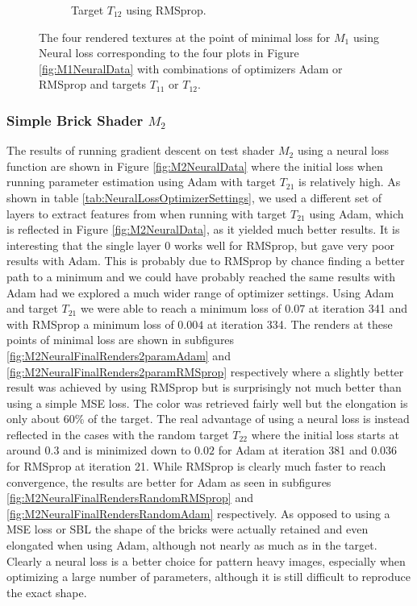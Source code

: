 \begin{figure}[hpb]
\begin{subfigure}[t]{.25\textwidth}
    \caption{Target $T_{12}$ using RMSprop.}
    \label{fig:M1NeuralFinalRendersRandomRMSprop}
\end{subfigure}
\caption{The four rendered textures at the point of minimal loss for $M_1$ using Neural loss corresponding to the four plots in Figure \ref{fig:M1NeuralData} with combinations of optimizers Adam or RMSprop and targets $T_{11}$ or $T_{12}$.}
\label{fig:M1NeuralFinalRenders}
\end{figure}

\subsubsection{Simple Brick Shader $M_2$}

The results of running gradient descent on test shader $M_2$ using a neural loss function are shown in Figure \ref{fig:M2NeuralData} where the initial loss when running parameter estimation using Adam with target $T_{21}$ is relatively high. As shown in table \ref{tab:NeuralLossOptimizerSettings}, we used a different set of layers to extract features from when running with target $T_{21}$ using Adam, which is reflected in Figure \ref{fig:M2NeuralData}, as it yielded much better results. It is interesting that the single layer 0 works well for RMSprop, but gave very poor results with Adam. This is probably due to RMSprop by chance finding a better path to a minimum and we could have probably reached the same results with Adam had we explored a much wider range of optimizer settings. Using Adam and target $T_{21}$ we were able to reach a minimum loss of $0.07$ at iteration 341 and with RMSprop a minimum loss of $0.004$ at iteration 334. The renders at these points of minimal loss are shown in subfigures \ref{fig:M2NeuralFinalRenders2paramAdam} and \ref{fig:M2NeuralFinalRenders2paramRMSprop} respectively where a slightly better result was achieved by using RMSprop but is surprisingly not much better than using a simple MSE loss. The color was retrieved fairly well but the elongation is only about 60\% of the target. The real advantage of using a neural loss is instead reflected in the cases with the random target $T_{22}$ where the initial loss starts at around $0.3$ and is minimized down to $0.02$ for Adam at iteration 381 and $0.036$ for RMSprop at iteration 21. While RMSprop is clearly much faster to reach convergence, the results are better for Adam as seen in subfigures \ref{fig:M2NeuralFinalRendersRandomRMSprop} and \ref{fig:M2NeuralFinalRendersRandomAdam} respectively. As opposed to using a MSE loss or SBL the shape of the bricks were actually retained and even elongated when using Adam, although not nearly as much as in the target. Clearly a neural loss is a better choice for pattern heavy images, especially when optimizing a large number of parameters, although it is still difficult to reproduce the exact shape.

